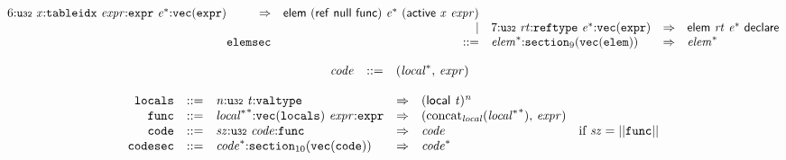 $$\begin{array}{@{}l@{}rrlll@{}l@{}}
6{:}{\mathtt{u{\scriptstyle32}}}~{\mathit{x}}{:}{\mathtt{tableidx}}~{\mathit{expr}}{:}{\mathtt{expr}}~{{\mathit{e}}^\ast}{:}{\mathtt{vec}}({\mathtt{expr}}) &\Rightarrow& \mathsf{elem}~(\mathsf{ref}~\mathsf{null}~\mathsf{func})~{{\mathit{e}}^\ast}~(\mathsf{active}~{\mathit{x}}~{\mathit{expr}}) \\ &&|&
7{:}{\mathtt{u{\scriptstyle32}}}~{\mathit{rt}}{:}{\mathtt{reftype}}~{{\mathit{e}}^\ast}{:}{\mathtt{vec}}({\mathtt{expr}}) &\Rightarrow& \mathsf{elem}~{\mathit{rt}}~{{\mathit{e}}^\ast}~\mathsf{declare} \\
& {\mathtt{elemsec}} &::=& {{\mathit{elem}}^\ast}{:}{{\mathtt{section}}}_{9}({\mathtt{vec}}({\mathtt{elem}})) &\Rightarrow& {{\mathit{elem}}^\ast} \\
\end{array}
$$

\vspace{1ex}

$$
\begin{array}{@{}lrrl@{}l@{}}
& {\mathit{code}} &::=& ({{\mathit{local}}^\ast},\, {\mathit{expr}}) \\
\end{array}
$$

$$
\begin{array}{@{}l@{}rrlll@{}l@{}}
& {\mathtt{locals}} &::=& {\mathit{n}}{:}{\mathtt{u{\scriptstyle32}}}~{\mathit{t}}{:}{\mathtt{valtype}} &\Rightarrow& {(\mathsf{local}~{\mathit{t}})^{{\mathit{n}}}} \\
& {\mathtt{func}} &::=& {{{\mathit{local}}^\ast}^\ast}{:}{\mathtt{vec}}({\mathtt{locals}})~{\mathit{expr}}{:}{\mathtt{expr}} &\Rightarrow& ({{\mathrm{concat}}}_{{\mathit{local}}}({{{\mathit{local}}^\ast}^\ast}),\, {\mathit{expr}}) \\
& {\mathtt{code}} &::=& {\mathit{sz}}{:}{\mathtt{u{\scriptstyle32}}}~{\mathit{code}}{:}{\mathtt{func}} &\Rightarrow& {\mathit{code}} &\quad
  \mbox{if}~{\mathit{sz}} = ||{\mathtt{func}}|| \\
& {\mathtt{codesec}} &::=& {{\mathit{code}}^\ast}{:}{{\mathtt{section}}}_{10}({\mathtt{vec}}({\mathtt{code}})) &\Rightarrow& {{\mathit{code}}^\ast} \\
\end{array}
$$

\vspace{1ex}

